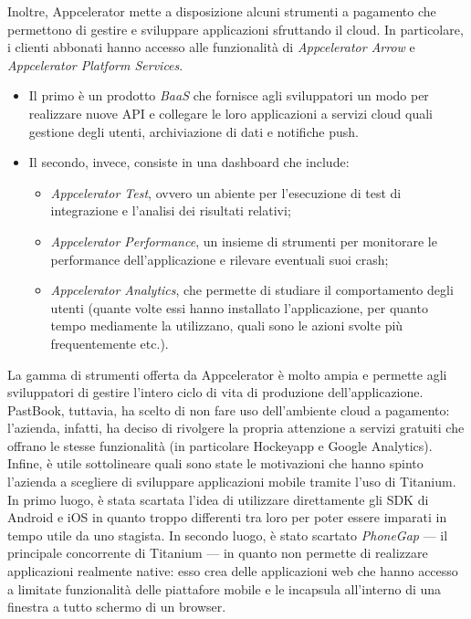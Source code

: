 				Inoltre, Appcelerator mette a disposizione alcuni strumenti a pagamento che permettono di gestire e sviluppare
				applicazioni sfruttando il cloud. In particolare, i clienti abbonati hanno accesso alle funzionalità di
				\emph{Appcelerator Arrow} e \emph{Appcelerator Platform Services}.
				\begin{itemize}
					\item Il primo è un prodotto \emph{BaaS} che fornisce agli sviluppatori un modo per realizzare nuove API e
					collegare le loro applicazioni a servizi cloud quali gestione degli utenti, archiviazione di dati e
					notifiche push.
					\item Il secondo, invece, consiste in una dashboard che include:
					\begin{itemize}
						\item \emph{Appcelerator Test}, ovvero un abiente per l'esecuzione di test di integrazione e
						l'analisi dei risultati relativi;
						\item \emph{Appcelerator Performance}, un insieme di strumenti per monitorare le performance
						dell'applicazione e rilevare eventuali suoi crash;
						\item \emph{Appcelerator Analytics}, che permette di studiare il comportamento degli utenti (quante
						volte essi hanno installato l'applicazione, per quanto tempo mediamente la utilizzano, quali sono
						le azioni svolte più frequentemente etc.).
					\end{itemize}
				\end{itemize}
				La gamma di strumenti offerta da Appcelerator è molto ampia e permette agli sviluppatori di gestire l'intero ciclo di
				vita di produzione dell'applicazione. PastBook, tuttavia, ha scelto di non fare uso dell'ambiente cloud a pagamento:
				l'azienda, infatti, ha deciso di rivolgere la propria attenzione a servizi gratuiti che offrano le stesse
				funzionalità (in particolare Hockeyapp e Google Analytics).\\
				Infine, è utile sottolineare quali sono state le motivazioni che hanno spinto l'azienda a scegliere di sviluppare
				applicazioni mobile tramite l'uso di Titanium. In primo luogo, è stata scartata l'idea di utilizzare direttamente gli
				SDK di Android e iOS in quanto troppo differenti tra loro per poter essere imparati in tempo utile da uno stagista.
				In secondo luogo, è stato scartato \emph{PhoneGap} — il principale concorrente di Titanium — in quanto non permette
				di realizzare applicazioni realmente native: esso crea delle applicazioni web che hanno accesso a limitate
				funzionalità delle piattafore mobile e le incapsula all'interno di una finestra a tutto schermo di un browser.
